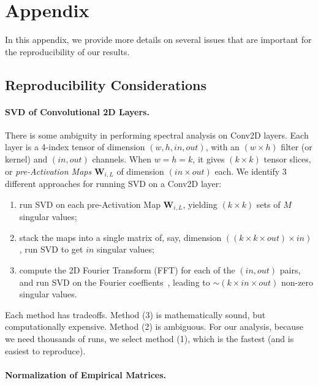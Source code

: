 \section{Appendix}
\label{sxn:appendix}


In this appendix, we provide more details on several issues that are important for the reproducibility of our results.


\subsection{Reproducibility Considerations}


\paragraph{SVD of Convolutional 2D Layers.}

There is some ambiguity in performing spectral analysis on Conv2D layers.  
Each layer is a 4-index tensor of dimension $(w,h,in,out)$, with an $(w\times h)$ filter (or kernel) and $(in, out)$
channels. When $w=h=k$, it gives $(k\times k)$ tensor slices, or \emph{pre-Activation Maps} $\mathbf{W}_{i,L}$ of dimension $(in\times out)$ each. 
%
We identify 3 different approaches for running SVD on a Conv2D layer:
\begin{enumerate}
\item run SVD on each pre-Activation Map $\mathbf{W}_{i,L}$, yielding $(k\times k)$ sets of $M$ singular values;
\item stack the maps into a single matrix of, say, dimension $((k\times k\times out)\times in)$, run SVD to get $in$ singular values;
\item compute the 2D Fourier Transform (FFT) for each of the $(in, out)$ pairs, and run SVD on the Fourier coeffients~\cite{CNNSVD}, leading to $\sim(k\times in\times out)$ non-zero singular values.
\end{enumerate}
Each method has tradeoffs.  
Method (3) is mathematically sound, but computationally expensive. Method (2) is ambiguous.
For our analysis, because we need thousands of runs, we select method (1), which is the fastest (and is easiest to reproduce).


\paragraph{Normalization of Empirical Matrices.}  

